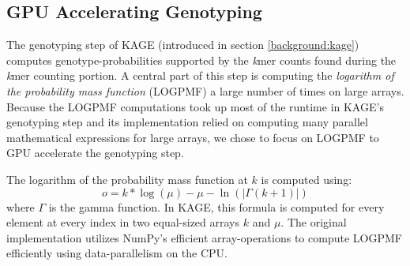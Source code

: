 \subsection{GPU Accelerating Genotyping} \label{methods:gpu_accelerating_genotyping}
The genotyping step of KAGE (introduced in section \ref{background:kage}) computes genotype-probabilities supported by the \textit{k}mer counts found during the \textit{k}mer counting portion.
A central part of this step is computing the \textit{logarithm of the probability mass function} (LOGPMF) a large number of times on large arrays.
Because the LOGPMF computations took up most of the runtime in KAGE's genotyping step and its implementation relied on computing many parallel mathematical expressions for large arrays, we chose to focus on LOGPMF to GPU accelerate the genotyping step.

The logarithm of the probability mass function at $k$ is computed using:
\begin{equation} \label{methods:gpu_accelerating_genotyping:equations:logpmf}
  o = k * \log(\mu) - \mu - \ln(|\Gamma(k + 1)|)
\end{equation}
where $\Gamma$ is the gamma function.
In KAGE, this formula is computed for every element at every index in two equal-sized arrays $k$ and $\mu$.
The original implementation utilizes NumPy's efficient array-operations to compute LOGPMF efficiently using data-parallelism on the CPU.

